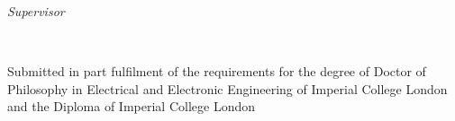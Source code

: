 {    \vfill
    \begin{minipage}[t]{.27\textwidth}
        \raggedleft
        \textit{Supervisor}
    \end{minipage}
    \hspace*{15pt}
    \begin{minipage}[t]{.65\textwidth}
        \thesisFirstSupervisor%
    \end{minipage} \\[10mm]
    \begin{minipage}[t]{.8\textwidth}
        {\small
        Submitted in part fulfilment of the requirements for the degree of
        Doctor of Philosophy in Electrical and Electronic Engineering of
        Imperial College London and the Diploma of Imperial College London}
    \end{minipage} \\[10mm]

    \thesisDate \\
    \clearpage
}


